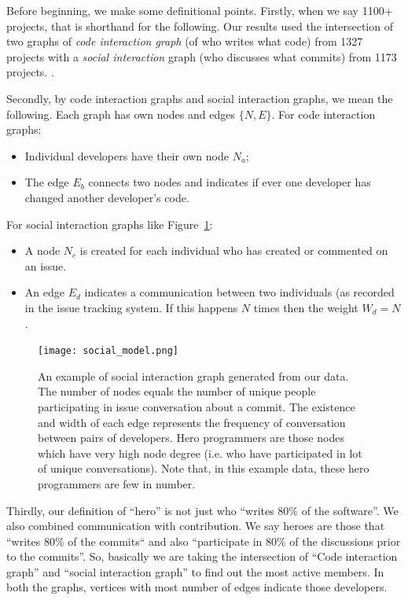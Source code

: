 \documentclass[sigconf,review]{acmart}
\newcommand{\bi}{\begin{itemize}}
\newcommand{\ei}{\end{itemize}}
\newcommand{\fig}[1]{Figure~\ref{fig:#1}}
\begin{document}
Before beginning, we make some definitional points.
Firstly, when we say 1100+ projects, that is shorthand for the following.
Our results used the intersection of two graphs of  {\em code interaction graph} (of who writes what code) from 1327 projects with
a {\em social interaction} graph (who discusses what commits)
from 1173 projects.    .

Secondly, by code interaction graphs
and  social interaction graphs, we mean the following. Each graph
has   own nodes and edges $\{N,E\}$. For
code interaction graphs:
\bi
\item Individual developers have their own  node $N_a$;
\item
The edge $E_b$ connects two nodes and indicates
if ever one  developer has changed another developer's code. 
\ei
For social interaction graphs like \fig{Socialgraph}:
\bi
\item A node $N_c$ is created for each  individual who has
created or commented on an issue.
\item An edge $E_d$ indicates a communication between two individuals
(as recorded in the issue tracking system.
If this happens $N$ times then the weight $W_d=N$.
\ei


 \begin{figure}[!t]
\begin{center}
\texttt{[image: social\_model.png]}
\end{center}
\caption{An example of social interaction graph generated from our data. 
The number  of nodes equals the number of unique people participating in issue conversation about a commit.
The existence and width  of each edge represents the frequency of conversation between pairs of developers. Hero programmers are those nodes which have very high node degree (i.e. who have participated in lot of unique conversations). Note that, in this example data, these hero
programmers are few in number.}
\label{fig:Socialgraph}
\end{figure}

Thirdly, our definition of ``hero'' is not just who ``writes 80\% of the software''. We also combined communication with contribution. 
We say heroes are those that ``writes 80\% of the commits`` and also ``participate in 80\% of the discussions prior to the commits''. So, basically we are taking the intersection of ``Code interaction graph'' and ``social interaction graph'' to find out the most active members. In both the graphs, vertices with most number of edges indicate those developers. 
 
\end{document}
